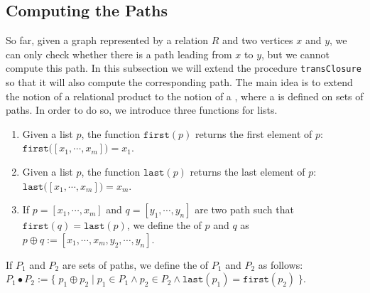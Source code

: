 \subsection{Computing the Paths}
So far, given a graph represented by a relation $R$ and two vertices $x$ and $y$, we can only check
whether there is a path leading from $x$ to $y$, but we cannot compute this path.  In this
subsection we will extend the procedure \texttt{transClosure} so that it will also compute the
corresponding path.  The main idea is to extend the notion of a relational product to the notion of
a , where a  is defined on sets of paths.  In order to do so,
we introduce three functions for lists.
\begin{enumerate}
\item Given a list $p$, the function $\texttt{first}(p)$ returns the first element of $p$: 
      \\[0.2cm]
      \hspace*{1.3cm}
      $\texttt{first}\bigl([x_1,\cdots,x_m]\bigr) = x_1$.
\item Given a list $p$, the function $\texttt{last}(p)$ returns the last element of $p$: 
      \\[0.2cm]
      \hspace*{1.3cm}
      $\texttt{last}\bigl([x_1,\cdots,x_m]\bigl) = x_m$.
\item If $p = [ x_1, \cdots, x_m ]$ and $q =[ y_1, \cdots, y_n ]$ are two path such that
      $\texttt{first}(q) = \texttt{last}(p)$, we define the  of $p$ and $q$ as \\[0.2cm]
      \hspace*{1.3cm}
      $p \oplus q := [x_1, \cdots, x_m, y_2, \cdots, y_n ]$.
\end{enumerate}
If $P_1$ and $P_2$ are sets of paths, we define the   of
$P_1$ and $P_2$ as follows: \\[0.2cm]
\hspace*{1.3cm} 
$P_1 \bullet P_2 := 
\bigl\{\; p_1 \oplus p_2 \mid p_1 \in P_1 \wedge p_2 \in P_2 \wedge \texttt{last}(p_1) =
\texttt{first}(p_2) \;\bigr\}
$.

